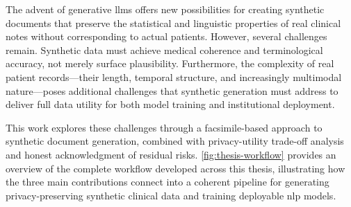 The advent of generative \glspl{llm} offers new possibilities for creating synthetic documents that preserve the statistical and linguistic properties of real clinical notes without corresponding to actual patients.
However, several challenges remain.
Synthetic data must achieve medical coherence and terminological accuracy, not merely surface plausibility.
Furthermore, the complexity of real patient records—their length, temporal structure, and increasingly multimodal nature—poses additional challenges that synthetic generation must address to deliver full data utility for both model training and institutional deployment.

This work explores these challenges through a facsimile-based approach to synthetic document generation, combined with privacy-utility trade-off analysis and honest acknowledgment of residual risks.
\autoref{fig:thesis-workflow} provides an overview of the complete workflow developed across this thesis, illustrating how the three main contributions connect into a coherent pipeline for generating privacy-preserving synthetic clinical data and training deployable \gls{nlp} models.

